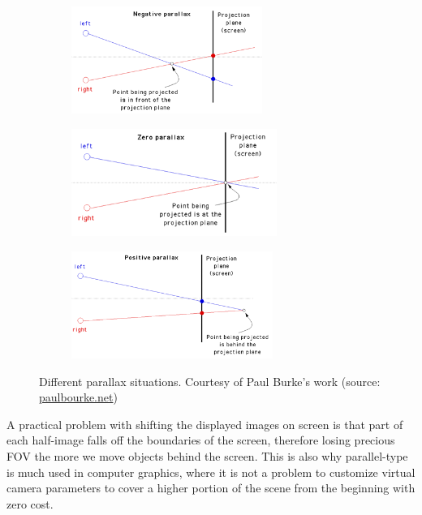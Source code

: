 \begin{figure}
\centering
\begin{subfigure}{0.32\textwidth}
\includegraphics[width=\linewidth, height=3.5cm]{schemas/negative_parallax}
\end{subfigure}
\hspace{\fill}
\begin{subfigure}{0.32\textwidth}
\includegraphics[width=\linewidth, height=3.5cm]{schemas/zero_parallax}
\end{subfigure}
\hspace{\fill}
\begin{subfigure}{0.32\textwidth}
\includegraphics[width=\linewidth, height=3.5cm]{schemas/positive_parallax}
\end{subfigure}
\caption{Different parallax situations. Courtesy of Paul Burke's work (source: \href{http://paulbourke.net/stereographics/stereorender/}{paulbourke.net}) \cite{stereo_pairs_cameras}}
\label{fig:parallax_plane}
\end{figure}

A practical problem with shifting the displayed images on screen is that part of each half-image falls off the boundaries of the screen, therefore losing precious FOV the more we move objects behind the screen. This is also why parallel-type is much used in computer graphics, where it is not a problem to customize virtual camera parameters to cover a higher portion of the scene from the beginning with zero cost.

